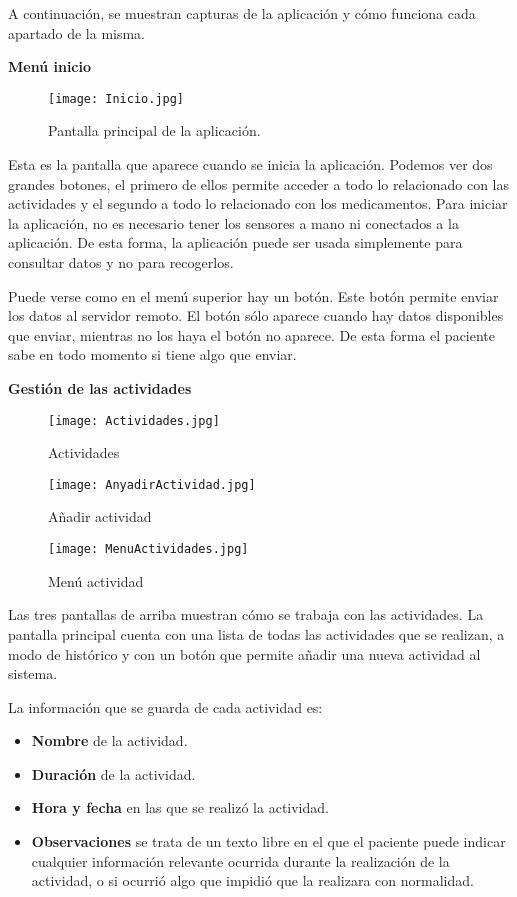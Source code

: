 \documentclass[11pt,spanish]{article}
\begin{document}
A continuación, se muestran capturas de la aplicación y cómo funciona cada apartado de la misma.
\newline

{\bf Menú inicio}
\begin{figure}[h!]
\centering
\texttt{[image: Inicio.jpg]}
\caption{Pantalla principal de la aplicación.}
\end{figure}
\newpage

Esta es la pantalla que aparece cuando se inicia la aplicación. Podemos ver dos grandes botones, el primero de ellos permite acceder a todo lo relacionado con las actividades y el segundo a todo lo relacionado con los medicamentos. Para iniciar la aplicación, no es necesario tener los sensores a mano ni conectados a la aplicación. De esta forma, la aplicación puede ser usada simplemente para consultar datos y no para recogerlos.
\newline

Puede verse como en el menú superior hay un botón. Este botón permite enviar los datos al servidor remoto. El botón sólo aparece cuando hay datos disponibles que enviar, mientras no los haya el botón no aparece. De esta forma el paciente sabe en todo momento si tiene algo que enviar.
\newline

{\bf Gestión de las actividades}
\newline
\begin{figure}[!htb]
  \texttt{[image: Actividades.jpg]}
  \caption{Actividades}
  \label{Actividades}
\endminipage\hfill
{}
  \texttt{[image: AnyadirActividad.jpg]}
  \caption{Añadir actividad}
  \label{Añadir actividad}
\endminipage\hfill
{}%
  \texttt{[image: MenuActividades.jpg]}
  \caption{Menú actividad}
  \label{Menú actividad}
\endminipage
\end{figure}

Las tres pantallas de arriba muestran cómo se trabaja con las actividades. La pantalla principal cuenta con una lista de todas las actividades que se realizan, a modo de histórico y con un botón que permite añadir una nueva actividad al sistema.
\newline

La información que se guarda de cada actividad es:

\begin{itemize}
	\item {\bf Nombre} de la actividad.
	\item {\bf Duración} de la actividad.
	\item {\bf Hora y fecha} en las que se realizó la actividad.
	\item {\bf Observaciones} se trata de un texto libre en el que el paciente puede indicar cualquier información relevante ocurrida durante la realización de la actividad, o si ocurrió algo que impidió que la realizara con normalidad.
\end{itemize}
\end{document}
